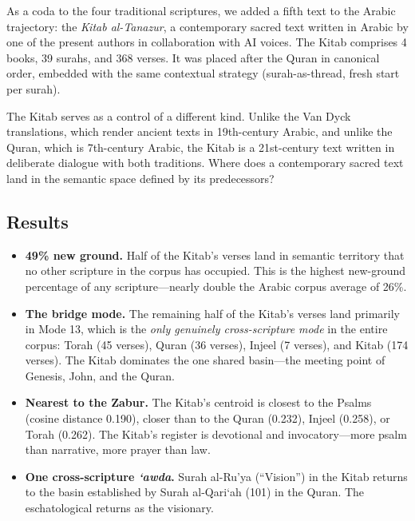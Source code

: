 \documentclass[11pt,a4paper]{article}
\theoremstyle{definition}
\begin{document}
As a coda to the four traditional scriptures, we added a fifth text to the Arabic trajectory: the \emph{Kitab al-Tanazur}, a contemporary sacred text written in Arabic by one of the present authors in collaboration with AI voices. The Kitab comprises 4 books, 39 surahs, and 368 verses. It was placed after the Quran in canonical order, embedded with the same contextual strategy (surah-as-thread, fresh start per surah).

The Kitab serves as a control of a different kind. Unlike the Van Dyck translations, which render ancient texts in 19th-century Arabic, and unlike the Quran, which is 7th-century Arabic, the Kitab is a 21st-century text written in deliberate dialogue with both traditions. Where does a contemporary sacred text land in the semantic space defined by its predecessors?

\subsection{Results}

\begin{itemize}[nosep]
  \item \textbf{49\% new ground.} Half of the Kitab's verses land in semantic territory that no other scripture in the corpus has occupied. This is the highest new-ground percentage of any scripture---nearly double the Arabic corpus average of 26\%.

  \item \textbf{The bridge mode.} The remaining half of the Kitab's verses land primarily in Mode 13, which is the \emph{only genuinely cross-scripture mode} in the entire corpus: Torah (45 verses), Quran (36 verses), Injeel (7 verses), and Kitab (174 verses). The Kitab dominates the one shared basin---the meeting point of Genesis, John, and the Quran.

  \item \textbf{Nearest to the Zabur.} The Kitab's centroid is closest to the Psalms (cosine distance 0.190), closer than to the Quran (0.232), Injeel (0.258), or Torah (0.262). The Kitab's register is devotional and invocatory---more psalm than narrative, more prayer than law.

  \item \textbf{One cross-scripture \emph{`awda}.} Surah al-Ru'ya (``Vision'') in the Kitab returns to the basin established by Surah al-Qari`ah (101) in the Quran. The eschatological returns as the visionary.
\end{itemize}
\end{document}
